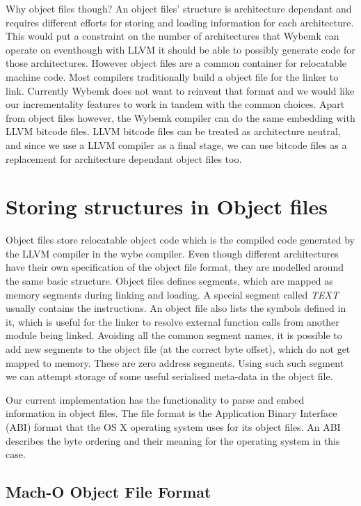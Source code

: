 Why object files though? An object files' structure is architecture dependant
and requires different efforts for storing and loading information for each
architecture. This would put a constraint on the number of architectures that
Wybemk can operate on eventhough with LLVM it should be able to possibly
generate code for those architectures. However object files are a common
container for relocatable machine code. Most compilers traditionally build a
object file for the linker to link. Currently Wybemk does not want to reinvent
that format and we would like our incrementality features to work in tandem
with the common choices. Apart from object files however, the Wybemk compiler
can do the same embedding with LLVM bitcode files. LLVM bitcode files can be
treated as architecture neutral, and since we use a LLVM compiler as a final
stage, we can use bitcode files as a replacement for architecture dependant
object files too. 


\section{Storing structures in Object files}

Object files store relocatable object code which is the compiled code generated
by the LLVM compiler in the wybe compiler. Even though different architectures
have their own specification of the object file format, they are modelled
around the same basic structure. Object files defines segments, which are
mapped as memory segments during linking and loading. A special segment called
\textit{TEXT} usually contains the instructions. An object file also lists the
symbols defined in it, which is useful for the linker to resolve external
function calls from another module being linked. Avoiding all the common
segment names, it is possible to add new segments to the object file (at the
correct byte offset), which do not get mapped to memory. These are zero address
segments. Using such such segment we can attempt storage of some useful
serialised meta-data in the object file. 

Our current implementation has the functionality to parse and embed information
in \macho object files. The \macho file format is the Application Binary
Interface (ABI) format that the OS X operating system uses for its object
files. An ABI describes the byte ordering and their meaning for the operating
system in this case. 

\subsection{Mach-O Object File Format}

